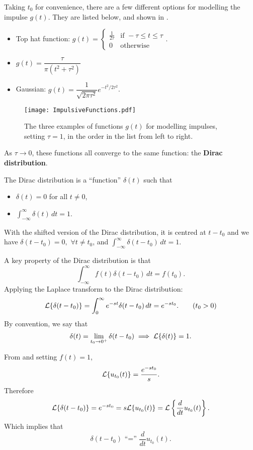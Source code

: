 Taking $t_0$ for convenience, there are a few different options for modelling the impulse $g(t)$. They are listed below, and shown in .
\begin{itemize}
	\item Top hat function: $g(t) = \begin{cases}\frac{1}{2\tau} & \text{if }-\tau \leq t \leq \tau \\ 0 & \text{otherwise}\end{cases}$.
	\item $g(t) = \dfrac{\tau}{\pi(t^2+\tau^2)}$
	\item Gaussian: $g(t) = \dfrac{1}{\sqrt{2\pi\tau^2}}e^{-t^2/2\tau^2}$.
\end{itemize}

\begin{figure}[!ht]
	\centering
	\texttt{[image: ImpulsiveFunctions.pdf]}
	\caption{The three examples of functions $g(t)$ for modelling impulses, setting $\tau=1$, in the order in the list from left to right.}
	\label{fig:impulsivefuncs}
\end{figure}

As $\tau \to 0$, these functions all converge to the same function: the \textbf{Dirac distribution}.

\begin{definition}
	The Dirac distribution is a ``function'' $\delta(t)$ such that
	\begin{itemize}
		\item $\delta(t)=0$ for all $t \neq 0$,
		\item $\int_{-\infty}^{\infty} \delta(t)\,dt = 1$.
	\end{itemize}
\end{definition}

With the shifted version of the Dirac distribution, it is centred at $t-t_0$ and we have $\delta(t-t_0)=0, \,\, \forall t\neq t_0$, and $\int_{-\infty}^{\infty} \delta(t-t_0)\,dt = 1$.

A key property of the Dirac distribution is that
\[
\int_{-\infty}^{\infty} f(t)\delta(t-t_0)\,dt = f(t_0).
\]
Applying the Laplace transform to the Dirac distribution:
\begin{equation*}
	\mathcal{L}\{\delta(t-t_0)\} = \int_0^{\infty} e^{-st}\delta(t-t_0) \,dt = e^{-st_0}. \tag{$t_0>0$}
\end{equation*}
By convention, we say that
\[
\delta(t) = \lim_{t_0 \to 0^+}\delta(t-t_0) \implies \mathcal{L}\{\delta(t)\} = 1.
\]

\begin{remark}
	From  and setting $f(t)=1$,
	\[
	\mathcal{L}\{u_{t_0}(t)\} = \frac{e^{-st_0}}{s}.
	\]
	Therefore
	\[
	\mathcal{L}\{\delta(t-t_0)\} = e^{-st_0} = s\mathcal{L}\{u_{t_0}(t)\} = \mathcal{L}\left\{\frac{d}{dt}u_{t_0}(t)\right\}.
	\]
	Which implies that
	\[
	\text{$\delta(t-t_0)$ ``='' $\frac{d}{dt}u_{t_0}(t).$}
	\]
\end{remark}

